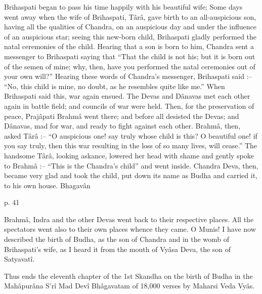 Brihaspati began to pass his time happily with his beautiful wife; Some days went away when the wife of Brihaspati, Târâ, gave birth to an all-auspicious son, having all the qualities of Chandra, on an auspicious day and under the influence of an auspicious star; seeing this new-born child, Brihaspati gladly performed the natal ceremonies of the child. Hearing that a son is born to him, Chandra sent a messenger to Brihaspati saying that “That the child is not his; but it is born out of the semen of mine; why, then, have you performed the natal ceremonies out of your own will?” Hearing these words of Chandra's messenger, Brihaspati said :-- “No, this child is mine, no doubt, as he resembles quite like me.” When Brihaspati said this, war again ensued. The Devas and Dânavas met each other again in battle field; and councils of war were held. Then, for the preservation of peace, Prajâpati Brahmâ went there; and before all desisted the Devas; and Dânavas, mad for war, and ready to fight against each other. Brahmâ, then, asked Târâ :-- “O auspicious one! say truly whose child is this? O beautiful one! if you say truly, then this war resulting in the loss of so many lives, will cease.” The handsome Târâ, looking askance, lowered her head with shame and gently spoke to Brahmâ :-- “This is the Chandra's child” and went inside. Chandra Deva, then, became very glad and took the child, put down its name as Budha and carried it, to his own house. Bhagavân

 

p. 41

 

Brahmâ, Indra and the other Devas went back to their respective places. All the spectators went also to their own places whence they came. O Munis! I have now described the birth of Budha, as the son of Chandra and in the womb of Brihaspati's wife, as I heard it from the mouth of Vyâsa Deva, the son of Satyavatî.

 

Thus ends the eleventh chapter of the 1st Skandha on the birth of Budha in the Mahâpurâna S'rî Mad Devî Bhâgavatam of 18,000 verses by Maharsi Veda Vyâs.